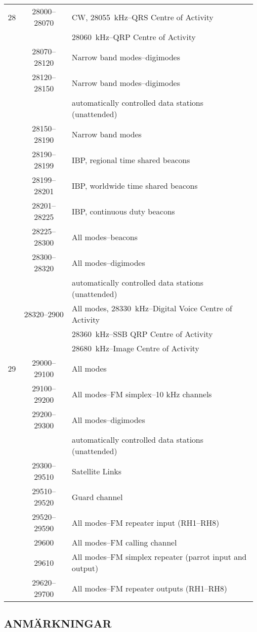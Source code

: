 \begin{longtable}{lcl}
28   & 28000--28070 & CW, 28055~kHz--QRS Centre of Activity\\
 & & 28060~kHz--QRP Centre of Activity\\
     & 28070--28120 & Narrow band modes--digimodes\\
     & 28120--28150 & Narrow band modes--digimodes\\
     & & automatically controlled data stations (unattended)\\
     & 28150--28190 & Narrow band modes\\
     & 28190--28199 & IBP, regional time shared beacons\\
     & 28199--28201 & IBP, worldwide time shared beacons\\
     & 28201--28225 & IBP, continuous duty beacons\\
     & 28225--28300 & All modes--beacons\\
     & 28300--28320 & All modes--digimodes\\
     & & automatically controlled data stations (unattended)\\
     & 28320--2900 & All modes, 28330~kHz--Digital Voice Centre of Activity\\
     & & 28360~kHz--SSB QRP Centre of Activity\\
     & & 28680~kHz--Image Centre of Activity\\

29   & 29000--29100 & All modes\\
     & 29100--29200 & All modes--FM simplex--10 kHz channels\\
     & 29200--29300 & All modes--digimodes\\
     & & automatically controlled data stations (unattended)\\
     & 29300--29510 & Satellite Links\\
     & 29510--29520 & Guard channel\\
     & 29520--29590 & All modes--FM repeater input (RH1--RH8)\\
     & 29600 & All modes--FM calling channel\\
     & 29610 & All modes--FM simplex repeater (parrot input and output)\\
     & 29620--29700 & All modes--FM repeater outputs (RH1--RH8)\\
\end{longtable}

\subsection{ANMÄRKNINGAR}

